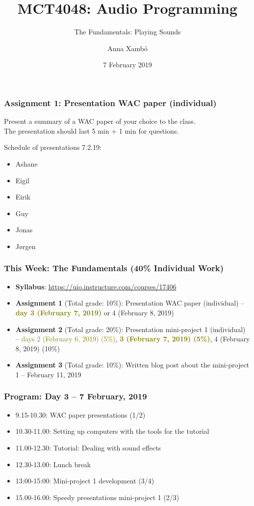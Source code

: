 \documentclass[screen, aspectratio=43]{beamer}
\title[AP-intro]{MCT4048: Audio Programming}
\subtitle{The Fundamentals: Playing Sounds}
\author[A. Xamb{\'o}]{Anna Xamb{\'o}}
\institute[NTNU]{Department of Music, NTNU}
\date{7 February 2019}
\begin{document}
\begin{frame}
  \titlepage
\end{frame}


%
\begin{frame}
\frametitle{Assignment 1: Presentation WAC paper (individual)}

Present a summary of a WAC paper of your choice to the class.\\ 
The presentation should last 5 min + 1 min for questions.

\vspace{10 mm}

Schedule of presentations 7.2.19:
\begin{itemize}
\item Ashane
\item Eigil
\item Eirik
\item Guy
\item Jonas
\item Jørgen
\end{itemize}
\end{frame}
%
\begin{frame}
\frametitle{This Week: The Fundamentals (40\% Individual Work)}
\begin{itemize}
\item \textbf{Syllabus}: \url{https://uio.instructure.com/courses/17406}
\item \textbf{Assignment 1} (Total grade: 10\%): Presentation WAC paper (individual) -- \textbf{\textcolor{olive}{day 3 (February 7, 2019)}} or 4 (February 8, 2019)
\item \textbf{Assignment 2} (Total grade: 20\%): Presentation mini-project 1 (individual) -- \textcolor{olive}{days 2 (February 6, 2019) (5\%)}, \textbf{\textcolor{olive}{3 (February 7, 2019) (5\%)}}, 4 (February 8, 2019) (10\%)
\item \textbf{Assignment 3} (Total grade: 10\%): Written blog post about the mini-project 1 -- February 11, 2019
\end{itemize}
\end{frame}
%
\begin{frame}
\frametitle{Program: Day 3 -- 7 February, 2019}
\begin{itemize}
\item 9.15-10.30: WAC paper presentations (1/2)
\item 10.30-11.00: Setting up computers with the tools for the tutorial
\item 11.00-12.30: Tutorial: Dealing with sound effects
\item 12.30-13.00: Lunch break
\item 13:00-15:00: Mini-project 1 development (3/4)
\item 15.00-16.00: Speedy presentations mini-project 1 (2/3)
\end{itemize}
\end{frame}
\end{document}
